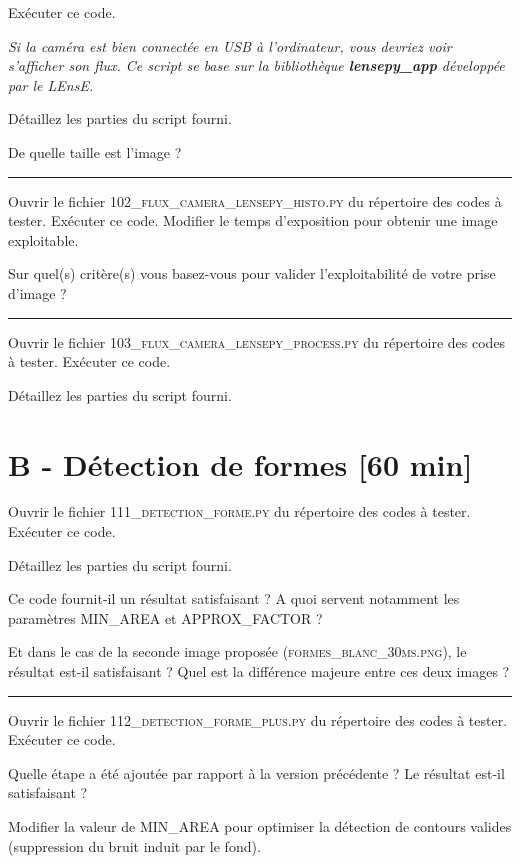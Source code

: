 \documentclass[a4paper,12pt,titlepage]{article} %
\begin{document}
\Manip Exécuter ce code.

\textit{Si la caméra est bien connectée en USB à l'ordinateur, vous devriez voir s'afficher son flux. Ce script se base sur la bibliothèque \textbf{lensepy\_app} développée par le LEnsE.}

\Quest Détaillez les parties du script fourni. 

\Quest De quelle taille est l'image ?

\noindent \rule{\linewidth}{1pt}

\Manip Ouvrir le fichier \textsc{102\_flux\_camera\_lensepy\_histo.py} du répertoire des codes à tester. Exécuter ce code. Modifier le temps d'exposition pour obtenir une image exploitable.

\Quest Sur quel(s) critère(s) vous basez-vous pour valider l'exploitabilité de votre prise d'image ?

\noindent \rule{\linewidth}{1pt}

\Manip Ouvrir le fichier \textsc{103\_flux\_camera\_lensepy\_process.py} du répertoire des codes à tester. Exécuter ce code.

\Quest Détaillez les parties du script fourni.

\newpage
\section{B - Détection de formes {[60 min]}}

\Manip Ouvrir le fichier \textsc{111\_detection\_forme.py} du répertoire des codes à tester. Exécuter ce code.

\Quest Détaillez les parties du script fourni.

\Quest Ce code fournit-il un résultat satisfaisant ? A quoi servent notamment les paramètres \textsc{MIN\_AREA} et \textsc{APPROX\_FACTOR} ?

\Quest Et dans le cas de la seconde image proposée (\textsc{formes\_blanc\_30ms.png}), le résultat est-il satisfaisant ? Quel est la différence majeure entre ces deux images ?

\noindent \rule{\linewidth}{1pt}

\Manip Ouvrir le fichier \textsc{112\_detection\_forme\_plus.py} du répertoire des codes à tester. Exécuter ce code.

\Quest Quelle étape a été ajoutée par rapport à la version précédente ? Le résultat est-il satisfaisant ?

\Manip Modifier la valeur de \textsc{MIN\_AREA} pour optimiser la détection de contours valides (suppression du bruit induit par le fond).
\end{document}
